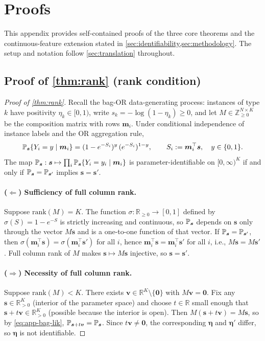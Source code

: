 \appendix

\section{Proofs}
\label{app:proofs}

This appendix provides self-contained proofs of the three core theorems
and the continuous-feature extension stated in
\cref{sec:identifiability,sec:methodology}. The setup
and notation follow \cref{sec:translation} throughout.

\subsection{Proof of \cref{thm:rank} (rank condition)}
\label{app:proof-rank}

\begin{proof}[Proof of \cref{thm:rank}]
Recall the bag-OR data-generating process: instances of type $k$
have positivity $\eta_k \in [0,1)$, write $s_k = -\log(1 - \eta_k)
\geq 0$, and let $M \in \mathbb{Z}_{\geq 0}^{N \times K}$ be the
composition matrix with rows $\bm{m}_i$. Under conditional
independence of instance labels and the OR aggregation rule,
\begin{equation}
  \mathbb{P}_{\bm s}\{Y_i = y \mid \bm m_i\}
   = (1 - e^{-S_i})^{y}\,(e^{-S_i})^{1-y},
   \qquad S_i := \bm m_i^\top \bm s, \quad y \in \{0,1\}.
   \label{eq:app-bag-lik}
\end{equation}
The map $\mathbb{P}_{\bm s} : \bm s \mapsto \prod_i
\mathbb{P}_{\bm s}\{Y_i = y_i \mid \bm m_i\}$ is parameter-identifiable
on $[0,\infty)^K$ if and only if $\mathbb{P}_{\bm s} = \mathbb{P}_{\bm s'}$
implies $\bm s = \bm s'$.

\paragraph{($\Leftarrow$) Sufficiency of full column rank.}
Suppose $\mathrm{rank}(M) = K$. The function
$\sigma : \mathbb{R}_{\geq 0} \to [0,1]$ defined by $\sigma(S) = 1 -
e^{-S}$ is strictly increasing and continuous, so $\mathbb{P}_{\bm s}$
depends on $\bm s$ only through the vector $M\bm s$ and is a
one-to-one function of that vector. If $\mathbb{P}_{\bm s} =
\mathbb{P}_{\bm s'}$, then $\sigma(\bm m_i^\top \bm s) = \sigma(\bm m_i^\top
\bm s')$ for all $i$, hence $\bm m_i^\top \bm s = \bm m_i^\top \bm s'$
for all $i$, i.e., $M\bm s = M\bm s'$. Full column rank of $M$ makes
$\bm s \mapsto M\bm s$ injective, so $\bm s = \bm s'$.

\paragraph{($\Rightarrow$) Necessity of full column rank.}
Suppose $\mathrm{rank}(M) < K$. There exists $\bm v \in \mathbb{R}^K
\setminus \{\bm 0\}$ with $M\bm v = \bm 0$. Fix any
$\bm s \in \mathbb{R}_{> 0}^K$ (interior of the parameter space)
and choose $t \in \mathbb{R}$ small enough that
$\bm s + t\bm v \in \mathbb{R}_{> 0}^K$ (possible because the
interior is open). Then $M(\bm s + t\bm v) = M\bm s$, so by
\eqref{eq:app-bag-lik}, $\mathbb{P}_{\bm s + t\bm v} = \mathbb{P}_{\bm s}$.
Since $t\bm v \neq \bm 0$, the corresponding $\bm \eta$ and
$\bm \eta'$ differ, so $\bm \eta$ is not identifiable.


\end{proof}
